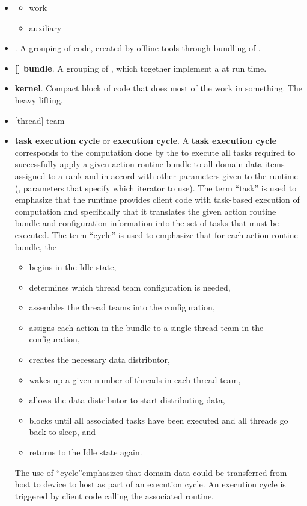 \documentclass{article}
\begin{document}
\begin{itemize}
\item \taskroutine
  \begin{itemize}
    \item work \taskroutine
    \item auxiliary \taskroutine
  \end{itemize}
\item \textbf{\taskcodebundle}. A grouping of code, created by offline tools through bundling of \ULtaskregs.
\item \textbf{[\actionroutine] bundle}. A grouping of \actionroutines, which together implement a \taskcodebundle
at run time.
\item \textbf{kernel}. Compact block of code that does most of the work in something. The heavy lifting.
\item {[}thread{]} team
\item \textbf{task execution cycle} or \textbf{execution cycle}.  A \textbf{task
execution cycle} corresponds to the computation done by
the \OR to execute all tasks required to successfully apply a given action
routine bundle to all domain data items assigned to a rank and in accord with
other parameters given to the runtime (\eg, parameters that specify which iterator
to use).  The term ``task'' is used to emphasize that the runtime provides
client code with task-based execution of computation and specifically that it
translates the given action routine bundle and configuration information into
the set of tasks that must be executed.  The term ``cycle'' is used to emphasize
that for each action routine bundle, the \OR
\begin{itemize}
\item{begins in the Idle state,}
\item{determines which thread team configuration is needed,}
\item{assembles the thread teams into the configuration,}
\item{assigns each action in the bundle to a single thread team in the
configuration,}
\item{creates the necessary data distributor,}
\item{wakes up a given number of threads in each thread team,}
\item{allows the data distributor to start distributing data,}
\item{blocks until all associated tasks have been executed and all threads go
back to sleep, and}
\item{returns to the Idle state again.}
\end{itemize}
The use of ``cycle''emphasizes that domain
data could be transferred from host to device to host as part of an execution
cycle.  An execution cycle is
triggered by client code calling the associated \OR routine.

\end{itemize}
\end{document}
